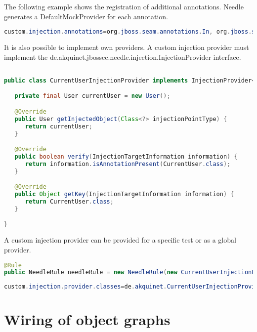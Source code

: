 The following example shows the registration of additional annotations. Needle generates a DefaultMockProvider for each annotation.

\begin{lstlisting}[language={JAVA},caption=Additional Annotation]
custom.injection.annotations=org.jboss.seam.annotations.In, org.jboss.seam.annotations.Logger
\end{lstlisting}

It is also possible to implement own providers. A custom injection provider must implement the de.akquinet.jbosscc.needle.injection.InjectionProvider interface.

\begin{lstlisting}[language={JAVA},caption=javax.inject.Qualifier Injection Provider]

public class CurrentUserInjectionProvider implements InjectionProvider<User> {

   private final User currentUser = new User();

   @Override
   public User getInjectedObject(Class<?> injectionPointType) {
      return currentUser;
   }

   @Override
   public boolean verify(InjectionTargetInformation information) {
      return information.isAnnotationPresent(CurrentUser.class);
   }

   @Override
   public Object getKey(InjectionTargetInformation information) {
      return CurrentUser.class;
   }

}
\end{lstlisting}

A custom injection provider can be provided for a specific test or as a global provider.

\begin{lstlisting}[language={JAVA},caption=Custom injection provider for a specific test]
@Rule
public NeedleRule needleRule = new NeedleRule(new CurrentUserInjectionProvider());
\end{lstlisting}


\begin{lstlisting}[language={JAVA},caption=Global custom injection provider]
custom.injection.provider.classes=de.akquinet.CurrentUserInjectionProvider
\end{lstlisting}


\section{Wiring of object graphs}
\label{sec:Wiring of object graphs}

